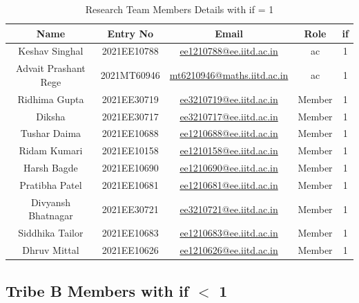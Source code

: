 \documentclass[12pt]{article} %
\begin{document}
\begin{table}[h!]
\centering
\begin{tabular}{|c|c|c|c|c|}
\hline
Name & Entry No & Email & Role & \acrshort{if} \\
\hline
Keshav Singhal & 2021EE10788 & \href{mailto:ee1210788@ee.iitd.ac.in}{ee1210788@ee.iitd.ac.in} & \acrshort{ac} & 1 \\
Advait Prashant Rege & 2021MT60946 & \href{mailto:mt6210946@maths.iitd.ac.in}{mt6210946@maths.iitd.ac.in} & \acrshort{ac} & 1 \\
Ridhima Gupta & 2021EE30719 & \href{mailto:ee3210719@ee.iitd.ac.in}{ee3210719@ee.iitd.ac.in} & Member & 1 \\
Diksha & 2021EE30717 & \href{mailto:ee3210717@ee.iitd.ac.in}{ee3210717@ee.iitd.ac.in} & Member & 1 \\
Tushar Daima & 2021EE10688 & \href{mailto:ee1210688@ee.iitd.ac.in}{ee1210688@ee.iitd.ac.in} & Member & 1 \\
Ridam Kumari & 2021EE10158 & \href{mailto:ee1210158@ee.iitd.ac.in}{ee1210158@ee.iitd.ac.in} & Member & 1 \\
Harsh Bagde & 2021EE10690 & \href{mailto:ee1210690@ee.iitd.ac.in}{ee1210690@ee.iitd.ac.in} & Member & 1 \\
Pratibha Patel & 2021EE10681 & \href{mailto:ee1210681@ee.iitd.ac.in}{ee1210681@ee.iitd.ac.in} & Member & 1 \\
Divyansh Bhatnagar & 2021EE30721 & \href{mailto:ee3210721@ee.iitd.ac.in}{ee3210721@ee.iitd.ac.in} & Member & 1 \\
Siddhika Tailor & 2021EE10683 & \href{mailto:ee1210683@ee.iitd.ac.in}{ee1210683@ee.iitd.ac.in} & Member & 1 \\
Dhruv Mittal & 2021EE10626 & \href{mailto:ee1210626@ee.iitd.ac.in}{ee1210626@ee.iitd.ac.in} & Member & 1 \\
\hline
\end{tabular}
\caption{Research Team Members Details with \acrshort{if} = 1}
\label{tab:teamDetails}
\end{table}

\clearpage

\subsection{Tribe B Members with  \acrshort{if} $<$ 1}

\begin{table}[h!]
\centering
{}
\caption{Design Team Members Details with \acrshort{if} $<$ 1}
\label{tab:teamDetails}
\end{table}
\end{document}
